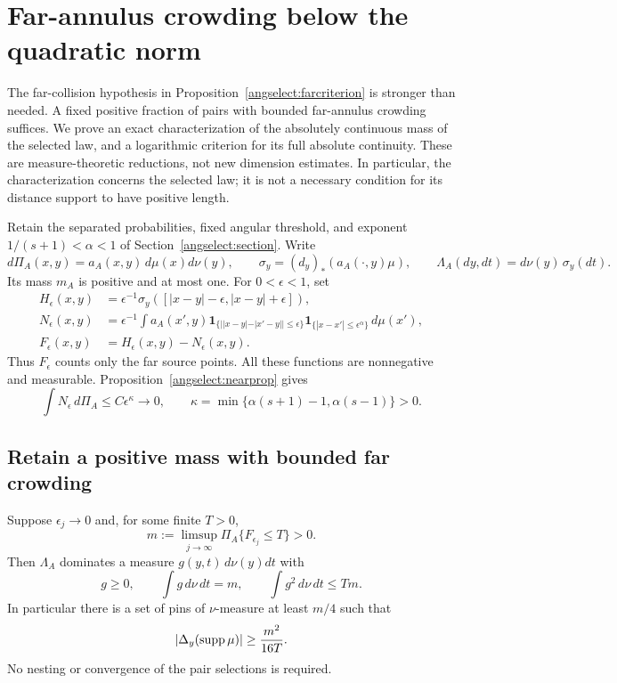 \section{Far-annulus crowding below the quadratic norm}
\label{crowding:section}

The far-collision hypothesis in Proposition~\ref{angselect:farcriterion}
is stronger than needed. A fixed positive fraction of pairs with bounded
far-annulus crowding suffices. We prove an exact characterization of the
absolutely continuous mass of the selected law, and a logarithmic criterion
for its full absolute continuity. These are measure-theoretic reductions,
not new dimension estimates. In particular, the characterization concerns
the selected law; it is not a necessary condition for its distance support
to have positive length.

Retain the separated probabilities, fixed angular threshold, and exponent
\(1/(s+1)<\alpha<1\) of Section~\ref{angselect:section}. Write
\[
 d\Pi_A(x,y)=a_A(x,y)\,d\mu(x)d\nu(y),\qquad
 \sigma_y=(d_y)_*(a_A(\cdot,y)\mu),\qquad
 \Lambda_A(dy,dt)=d\nu(y)\,\sigma_y(dt).
\]
Its mass \(m_A\) is positive and at most one. For \(0<\epsilon<1\), set
\begin{align*}
 H_\epsilon(x,y)
 &=\epsilon^{-1}\sigma_y
   ([|x-y|-\epsilon,|x-y|+\epsilon]),\\
 N_\epsilon(x,y)
 &=\epsilon^{-1}\int a_A(x',y)
   \mathbf1_{\{||x-y|-|x'-y||\le\epsilon\}}
   \mathbf1_{\{|x-x'|\le\epsilon^\alpha\}}\,d\mu(x'),\\
 F_\epsilon(x,y)&=H_\epsilon(x,y)-N_\epsilon(x,y).
\end{align*}
Thus \(F_\epsilon\) counts only the far source points. All these
functions are nonnegative and measurable. Proposition~\ref{angselect:nearprop}
gives
\begin{equation}\label{crowding:near}
 \int N_\epsilon\,d\Pi_A\le C\epsilon^\kappa\longrightarrow0,
 \qquad
 \kappa=\min\{\alpha(s+1)-1,\alpha(s-1)\}>0.
\end{equation}

\subsection{Retain a positive mass with bounded far crowding}

\begin{proposition}\label{crowding:positive}
Suppose \(\epsilon_j\to0\) and, for some finite \(T>0\),
\[
 m:=\limsup_{j\to\infty}
       \Pi_A\{F_{\epsilon_j}\le T\}>0.
\]
Then \(\Lambda_A\) dominates a measure \(g(y,t)\,d\nu(y)dt\) with
\[
 g\ge0,\qquad \int g\,d\nu\,dt=m,\qquad
 \int g^2\,d\nu\,dt\le Tm.
\]
In particular there is a set of pins of \(\nu\)-measure at least
\(m/4\) such that
\[
 |\Delta_y(\operatorname{supp}\mu)|\ge \frac{m^2}{16T}.
\]
No nesting or convergence of the pair selections is required.
\end{proposition}

